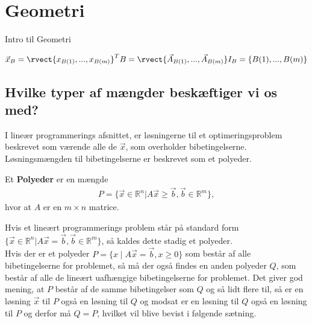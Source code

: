 \chapter{Geometri}
Intro til Geometri
\begin{defn}
$\vec{x}_B = \rvect{x_{B(1)}, ..., x_{B(m)}}^T\\
B=\rvect{\vec{A}_{B(1)},...,\vec{A}_{B(m)}}\\
I_B =\{B(1),...,B(m)\}$
\end{defn}


\section{Hvilke typer af mængder beskæftiger vi os med?}
I lineær programmerings afsnittet, er løsningerne til et optimeringsproblem beskrevet som værende alle de $\vec{x}$, som overholder bibetingelserne. Løsningsmængden til bibetingelserne er beskrevet som et polyeder.
\begin{defn} [Polyeder]
Et \textbf{Polyeder} er en mængde 
\begin{align*}
 P =\{ \vec{x} \in \mathds{R}^n | A \vec{x} \geq \vec{b}, \vec{b}\in \mathds{R}^m\},
\end{align*}
hvor at $A$ er en $m \times n$ matrice.
\end{defn}
Hvis et lineært programmerings problem står på standard form $\{ \vec{x} \in \mathds{R}^n | A \vec{x} = \vec{b}, \vec{b}\in \mathds{R}^m\}$, så kaldes dette stadig et polyeder.\\

Hvis der er et polyeder $P=\{x\mid A\vec{x}=\vec{b},x\geq 0\}$ som består af alle bibetingelserne for problemet, så må der også findes en anden polyeder $Q$, som består af alle de lineært uafhængige bibetingelserne for problemet. Det giver god mening, at $P$ består af de samme bibetingelser som $Q$ og så lidt flere til, så er en løsning $\vec{x}$ til $P$ også en løsning til $Q$ og modsat er en løsning til $Q$ også en løsning til $P$ og derfor må $Q=P$, hvilket vil blive bevist i følgende sætning.

